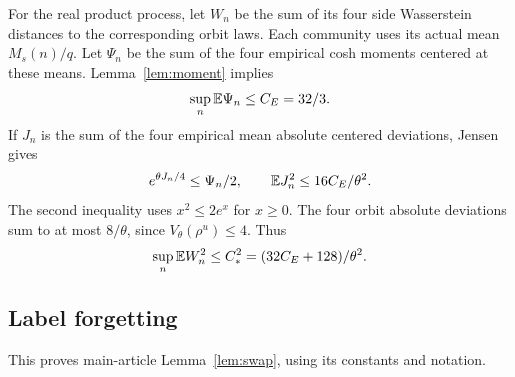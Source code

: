 For the real product process, let $W_n$ be the sum of its four side Wasserstein distances to the corresponding orbit laws. Each community uses its actual mean $M_s(n)/q$. Let $\Psi_n$ be the sum of the four empirical cosh moments centered at these means. Lemma~\ref*{lem:moment} implies
\[
 \sup_n\mathbb E\Psi_n\le C_E=32/3.
\]
If $J_n$ is the sum of the four empirical mean absolute centered deviations, Jensen gives
\[
 e^{\theta J_n/4}\le\Psi_n/2,\qquad
 \mathbb E J_n^2\le16C_E/\theta^2.
\]
The second inequality uses $x^2\le2e^x$ for $x\ge0$. The four orbit absolute deviations sum to at most $8/\theta$, since $V_\theta(\rho^u)\le4$. Thus
\begin{equation}\label{eq:trackingmomentaux}
 \sup_n\mathbb E W_n^2\le C_*^2=(32C_E+128)/\theta^2.
\end{equation}


\subsection{Label forgetting}\label{app:swapdetails}
This proves main-article Lemma~\ref*{lem:swap}, using its constants and notation.

